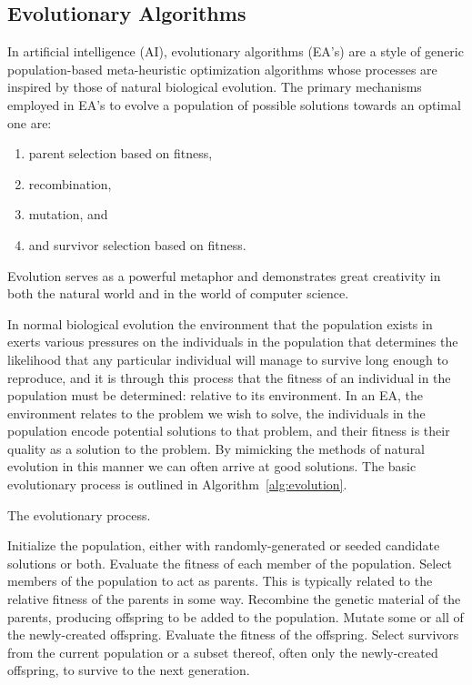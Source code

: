\subsection{Evolutionary Algorithms}
In artificial intelligence (AI), evolutionary algorithms (EA's) are a style of generic population-based meta-heuristic optimization algorithms whose processes are inspired by those of natural biological evolution.
The primary mechanisms employed in EA's to evolve a population of possible solutions towards an optimal one are:
\begin{enumerate}
\item parent selection based on fitness,
\item recombination,
\item mutation, and
\item and survivor selection based on fitness.
\end{enumerate}
Evolution serves as a powerful metaphor and demonstrates great creativity in both the natural world and in the world of computer science.

In normal biological evolution the environment that the population exists in exerts various pressures on the individuals in the population that determines the likelihood that any particular individual will manage to survive long enough to reproduce, and it is through this process that the fitness of an individual in the population must be determined: relative to its environment.
In an EA, the environment relates to the problem we wish to solve, the individuals in the population encode potential solutions to that problem, and their fitness is their quality as a solution to the problem.
By mimicking the methods of natural evolution in this manner we can often arrive at good solutions.
The basic evolutionary process is outlined in Algorithm~\ref{alg:evolution}.

\begin{algorithm}[H]
\caption{The evolutionary process.}
\begin{algorithmic}[1]
\label{alg:evolution}
\STATE
Initialize the population, either with randomly-generated or seeded candidate solutions or both.
\STATE
Evaluate the fitness of each member of the population.
\REPEAT
  \STATE
  Select members of the population to act as parents.
  This is typically related to the relative fitness of the parents in some way.
  \STATE
  Recombine the genetic material of the parents, producing offspring to be added to the population.
  \STATE
  Mutate some or all of the newly-created offspring.
  \STATE
  Evaluate the fitness of the offspring.
  \STATE
  Select survivors from the current population or a subset thereof, often only the newly-created offspring, to survive to the next generation.
\end{algorithmic}
\end{algorithm}
